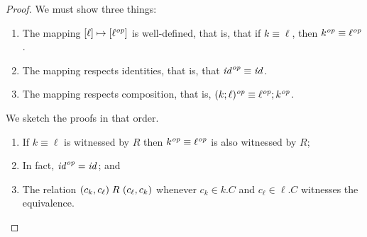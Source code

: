 \begin{defn}[$R$-similarity]
\begin{theorem}
\begin{lemma}
\begin{proof}
We must show three things:
\begin{enumerate}
    \item The mapping $[\ell] \mapsto [\ell^\mathit{op}]$ is
        well-defined, that is, that if $k \equiv \ell$, then $k^\mathit{op} \equiv
        \ell^\mathit{op}$.
    \item The mapping respects identities, that is, that $\mathit{id}^\mathit{op} \equiv
        \mathit{id}$.
    \item The mapping respects composition, that is, $(k;\ell)^\mathit{op} \equiv
        \ell^\mathit{op};k^\mathit{op}$.
\end{enumerate}
We sketch the proofs in that order. 
\begin{enumerate}
    \item If $k \equiv \ell$ is witnessed by $R$ then $k^\mathit{op} \equiv
        \ell^\mathit{op}$ is also witnessed by $R$; 
    \item In fact, $\mathit{id}^\mathit{op} = \mathit{id}$; \ifdissertation and \fi
    \item The relation $(c_k,c_\ell) \mathrel{R_{}} (c_\ell,c_k)$ whenever $c_k \in
        k.C$ and $c_\ell \in \ell.C$ witnesses the equivalence.
        \ifdissertation\endofpf\fi



\end{enumerate}
\end{proof}


\end{lemma}
\end{theorem}
\end{defn}
